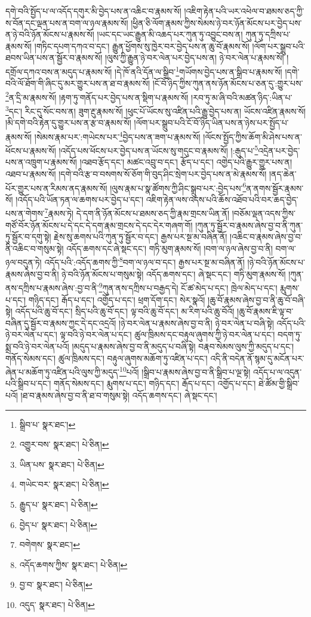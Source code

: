 དགེ་བའི་སྤྱོད་པ་ལ་འདོད་དགུར་མི་བྱེད་པས་ན་འཆིང་བ་རྣམས་སོ། །འཇིག་རྟེན་པའི་ཡར་འཕེལ་བ་ཐམས་ཅད་ཀྱི་ས་བོན་དང་ལྡན་པས་ན་བག་ལ་ཉལ་རྣམས་སོ། །ཕྱིན་ཅི་ལོག་རྣམས་ཀྱིས་སེམས་ཉེ་བར་ཉོན་མོངས་པར་བྱེད་པས་ན་ཉེ་བའི་ཉོན་མོངས་པ་རྣམས་སོ། །ཡང་དང་ཡང་རྒྱུན་མི་འཆད་པར་ཀུན་ཏུ་འབྱུང་བས་ན། ཀུན་ཏུ་དཀྲིས་པ་རྣམས་སོ། །གཏིང་དཔག་དཀའ་བ་དང་། རྒྱུན་ཕྱོགས་སུ་ཁྱེར་བར་བྱེད་པས་ན་ཆུ་བོ་རྣམས་སོ། །ལོག་པར་སྒྲུབ་པའི་ཐབས་ཡིན་པས་ན་སྦྱོར་བ་རྣམས་སོ། །ལུས་ཀྱི་རྒྱུན་ཉེ་བར་ལེན་པར་བྱེད་པས་ན། ཉེ་བར་ལེན་པ་རྣམས་སོ། །དགྲོལ་དཀའ་བས་ན་མདུད་པ་རྣམས་སོ། །དེ་ཁོ་ནའི་དོན་ལ་སྒྲིབ་\footnote{སྒྲིབ་པ་  སྣར་ཐང་། }གཡོགས་བྱེད་པས་ན་སྒྲིབ་པ་རྣམས་སོ། །དགེ་བའི་ལོ་ཐོག་གི་ཞིང་དུ་མར་གྱུར་པས་ན་ཐ་བ་རྣམས་སོ། །ངོ་བོ་ཉིད་ཀྱིས་ཀུན་ནས་ཉོན་མོངས་པ་ཅན་དུ་:གྱུར་པས་\footnote{འགྱུར་བས་  སྣར་ཐང་།  པེ་ཅིན། }ན་དྲི་མ་རྣམས་སོ། །རྟག་ཏུ་གནོད་པར་བྱེད་པས་ན་སྡིག་པ་རྣམས་སོ། །རབ་ཏུ་མ་ཞི་བའི་མཚན་ཉིད་:ཡིན་པ་\footnote{ཡིན་པས་  སྣར་ཐང་།  པེ་ཅིན། }དང་། རིང་དུ་སོང་བས་ན། ཟུག་རྔུ་རྣམས་སོ། །ཕུང་པོ་ཡོངས་སུ་འཛིན་པའི་རྒྱུ་བྱེད་པས་ན། ཡོངས་འཛིན་རྣམས་སོ། །མི་དགེ་བའི་རྟེན་དུ་གྱུར་པས་ན་རྩ་བ་རྣམས་སོ། །ལོག་པར་སྒྲུབ་པའི་ངོ་བོ་ཉིད་ཡིན་པས་ན་ཉེས་པར་སྤྱོད་པ་རྣམས་སོ། །སེམས་རྣམ་པར་:གཡེངས་པར་\footnote{གཡེང་བར་  སྣར་ཐང་།  པེ་ཅིན། }བྱེད་པས་ན་ཟག་པ་རྣམས་སོ། །ལོངས་སྤྱོད་ཀྱིས་ཆོག་མི་ཤེས་པས་ན་ཕོངས་པ་རྣམས་སོ། །འདོད་པས་ཕོངས་པར་བྱེད་པས་ན་ཡོངས་སུ་གདུང་བ་རྣམས་སོ། །:རྒུད་པ་\footnote{རྒྱུད་པ་  སྣར་ཐང་།  པེ་ཅིན། }འདྲེན་པར་བྱེད་པས་ན་འཁྲུག་པ་རྣམས་སོ། །འཐབ་རྩོད་དང་། མཚང་འབྲུ་བ་དང་། རྩོད་པ་དང་། འགྱེད་པའི་རྒྱུར་གྱུར་པས་ན། འཐབ་པ་རྣམས་སོ། །དགེ་བའི་རྩ་བ་བསགས་སོ་ཅོག་གི་བུད་ཤིང་སྲེག་པར་བྱེད་པས་ན་མེ་རྣམས་སོ། །ནད་ཆེན་པོར་གྱུར་པས་ན་རིམས་ནད་རྣམས་སོ། །ལུས་རྣམ་པ་སྣ་ཚོགས་ཀྱི་ཤིང་སྒྲུབ་པར་:བྱེད་པས་\footnote{བྱེད་པ་  སྣར་ཐང་།  པེ་ཅིན། }ན་ནགས་སྦྱོར་རྣམས་སོ། །འདོད་པའི་ཡོན་ཏན་ལ་ཆགས་པར་བྱེད་པ་དང་། འཇིག་རྟེན་ལས་འདས་པའི་ཆོས་འཐོབ་པའི་བར་ཆད་བྱེད་པས་ན་གེགས་\footnote{བགེགས་  སྣར་ཐང་། }རྣམས་ཏེ། དེ་དག་ནི་ཉོན་མོངས་པ་ཐམས་ཅད་ཀྱི་རྣམ་གྲངས་ཡིན་ནོ། །བཅོམ་ལྡན་འདས་ཀྱིས་གཙོ་བོར་ཉོན་མོངས་པ་དེ་དང་དེ་དག་རྣམ་གྲངས་དེ་དང་དེར་གཞག་གོ། །ཀུན་ཏུ་སྦྱོར་བ་རྣམས་ཞེས་བྱ་བ་ནི་ཀུན་ཏུ་སྦྱོར་བ་དགུ་སྟེ། རྗེས་སུ་ཆགས་པའི་ཀུན་ཏུ་སྦྱོར་བ་དང་། རྒྱས་པར་སྔ་མ་བཞིན་ནོ། །འཆིང་བ་རྣམས་ཞེས་བྱ་བ་ནི་འཆིང་བ་གསུམ་སྟེ། འདོད་ཆགས་དང་ཞེ་སྡང་དང་། གཏི་མུག་རྣམས་སོ། །བག་ལ་ཉལ་ཞེས་བྱ་བ་ནི། བག་ལ་ཉལ་བདུན་ཏེ། འདོད་པའི་:འདོད་ཆགས་ཀྱི་\footnote{འདོད་ཆགས་ཀྱིས་  སྣར་ཐང་།  པེ་ཅིན། }བག་ལ་ཉལ་བ་དང་། རྒྱས་པར་སྔ་མ་བཞིན་ནོ། །ཉེ་བའི་ཉོན་མོངས་པ་རྣམས་ཞེས་བྱ་བ་ནི། ཉེ་བའི་ཉོན་མོངས་པ་གསུམ་སྟེ། འདོད་ཆགས་དང་། ཞེ་སྡང་དང་། གཏི་མུག་རྣམས་སོ། །ཀུན་ནས་དཀྲིས་པ་རྣམས་ཞེས་:བྱ་བ་ནི་\footnote{བྱ་བ་  སྣར་ཐང་།  པེ་ཅིན། }ཀུན་ནས་དཀྲིས་པ་བརྒྱད་དེ། ངོ་ཚ་མེད་པ་དང་། ཁྲེལ་མེད་པ་དང་། རྨུགས་པ་དང་། གཉིད་དང་། རྒོད་པ་དང་། འགྱོད་པ་དང་། ཕྲག་དོག་དང་། སེར་སྣའོ། །ཆུ་བོ་རྣམས་ཞེས་བྱ་བ་ནི་ཆུ་བོ་བཞི་སྟེ། འདོད་པའི་ཆུ་བོ་དང་། སྲིད་པའི་ཆུ་བོ་དང་། ལྟ་བའི་ཆུ་བོ་དང་། མ་རིག་པའི་ཆུ་བོའོ། །ཆུ་བོ་རྣམས་ཇི་ལྟ་བ་བཞིན་དུ་སྦྱོར་བ་རྣམས་ཀྱང་དེ་དང་འདྲའོ། །ཉེ་བར་ལེན་པ་རྣམས་ཞེས་བྱ་བ་ནི། ཉེ་བར་ལེན་པ་བཞི་སྟེ། འདོད་པའི་ཉེ་བར་ལེན་པ་དང་། ལྟ་བའི་ཉེ་བར་ལེན་པ་དང་། ཚུལ་ཁྲིམས་དང་བརྟུལ་ཞུགས་ཀྱི་ཉེ་བར་ལེན་པ་དང་། བདག་ཏུ་སྨྲ་བའི་ཉེ་བར་ལེན་པའོ། །མདུད་པ་རྣམས་ཞེས་བྱ་བ་ནི་མདུད་པ་བཞི་སྟེ། བརྣབ་སེམས་ལུས་ཀྱི་མདུད་པ་དང་། གནོད་སེམས་དང་། ཚུལ་ཁྲིམས་དང་། བརྟུལ་ཞུགས་མཆོག་ཏུ་འཛིན་པ་དང་། འདི་ནི་བདེན་ནོ་སྙམ་དུ་མངོན་པར་ཞེན་པ་མཆོག་ཏུ་འཛིན་པའི་ལུས་ཀྱི་མདུད་\footnote{འདུད་  སྣར་ཐང་།  པེ་ཅིན། }པའོ། །སྒྲིབ་པ་རྣམས་ཞེས་བྱ་བ་ནི་སྒྲིབ་པ་ལྔ་སྟེ། འདོད་པ་ལ་འདུན་པའི་སྒྲིབ་པ་དང་། གནོད་སེམས་དང་། རྨུགས་པ་དང་། གཉིད་དང་། རྒོད་པ་དང་། འགྱོད་པ་དང་། ཐེ་ཚོམ་གྱི་སྒྲིབ་པའོ། །ཐ་བ་རྣམས་ཞེས་བྱ་བ་ནི་ཐ་བ་གསུམ་སྟེ། འདོད་ཆགས་དང་། ཞེ་སྡང་དང་། 